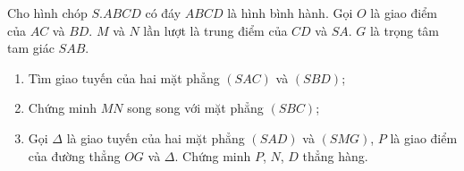 \begin{bt}%
Cho hình chóp $S.ABCD$ có đáy $ABCD$ là hình bình hành. Gọi $O$ là giao điểm của $AC$ và $BD$. $M$ và $N$ lần lượt là trung điểm của $CD$ và $SA$. $G$ là trọng tâm tam giác $SAB$.
\begin{enumerate}
\item Tìm giao tuyến của hai mặt phẳng $(SAC)$ và $(SBD)$;
\item Chứng minh $MN$ song song với mặt phẳng $(SBC)$;
\item Gọi $\Delta$ là giao tuyến của hai mặt phẳng $(SAD)$ và $(SMG)$, $P$ là giao điểm của đường thẳng $OG$ và $\Delta$. Chứng minh $P$, $N$, $D$ thẳng hàng.
\end{enumerate}
\end{bt}
